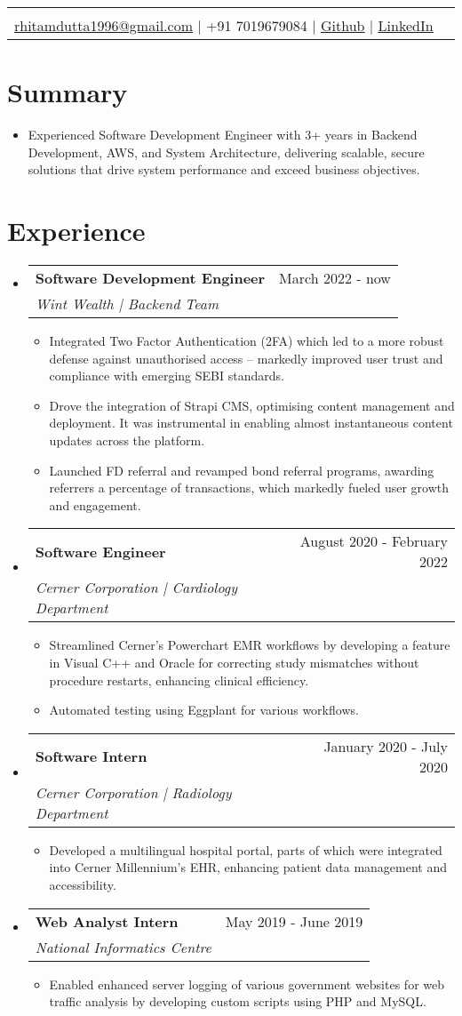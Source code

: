 \documentclass[letterpaper,11pt]{article}
\makeatletter
\newcommand{\sectionStart}{
  \begin{itemize}[label={},leftmargin=0in]
}
\newcommand{\sectionEnd}{
  \end{itemize}
}
\newcommand{\head}[6]{
  \noindent
  \begin{tabular*}{\textwidth}{l@{\extracolsep{\fill}}r}
    \centerline{
      \textbf{\href{#1}{\color{blue}{\LARGE {\underline{#2}}}}}
    }
    \vspace{5pt}\\
    \centerline{
      \href{mailto:#3}{\underline{#3}} $\mid$
      #4 $\mid$
       \href{#5}{\underline{Github}} $\mid$
       \href{#6}{\underline{LinkedIn}}
    }
  \end{tabular*}
  \vspace{-10pt}
}
\newcommand{\summaryText}[1]{
  \item
  \begin{addmargin}[7pt]{0pt}
    \small{#1}
  \end{addmargin}
}
\newcommand{\jobHeading}[3]{
  \vspace{-1pt}
  \item
  \begin{tabular*}{1.0\textwidth}{l@{\extracolsep{\fill}}r@{}}
    \normalsize{\textbf{#1}} & #2 \\
    \textit{\small#3} \\
  \end{tabular*}\vspace{-5pt}
}
\newcommand{\listStart}{\begin{itemize}}
\newcommand{\listEnd}{\end{itemize}\vspace{-6pt}}
\newcommand{\bulletItem}[1]{
  \item
  \small{
    {#1 \vspace{-1.8pt}}
  }
}
\makeatother
\begin{document}
\head
  {https://rhit.am/portfolio/} %
  {Rhitam Dutta} %
  {rhitamdutta1996@gmail.com} %
  {+91 7019679084} %
  {https://github.com/exthazor} %
  {https://www.linkedin.com/in/rhitam-dutta} %

\section{Summary}
\sectionStart
  \summaryText
  {Experienced Software Development Engineer with 3+ years in Backend Development, AWS, and System Architecture, delivering scalable, secure solutions that drive system performance and exceed business objectives.}
\sectionEnd

\section{Experience}
\sectionStart
 \jobHeading
    {Software Development Engineer}
    {March 2022 - now}
    {Wint Wealth | Backend Team}
  \listStart
    \bulletItem
    {Integrated Two Factor Authentication (2FA) which led to a more robust defense against unauthorised access -- markedly improved user trust and compliance with emerging SEBI standards.}
    \bulletItem
    {Drove the integration of Strapi CMS, optimising content management and deployment. It was instrumental in enabling almost instantaneous content updates across the platform.}
   \bulletItem
    {Launched FD referral and revamped bond referral programs, awarding referrers a percentage of transactions, which markedly fueled user growth and engagement.}
   \listEnd
  \jobHeading
    {Software Engineer}
    {August 2020 - February 2022}
    {Cerner Corporation | Cardiology Department}
  \listStart
    \bulletItem
    {Streamlined Cerner's Powerchart EMR workflows by developing a feature in Visual C++ and Oracle for correcting study mismatches without procedure restarts, enhancing clinical efficiency. }
   \bulletItem
   {Automated testing using Eggplant for various workflows.}
   \listEnd
  \jobHeading
    {Software Intern} 
    {January 2020 - July 2020}
    {Cerner Corporation | Radiology Department}
  \listStart
    \bulletItem
    {Developed a multilingual hospital portal, parts of which were integrated into Cerner Millennium's EHR, enhancing patient data management and accessibility.}
  \listEnd
  \jobHeading
    {Web Analyst Intern} 
    {May 2019 - June 2019}
    {National Informatics Centre}
  \listStart
    \bulletItem
    {Enabled enhanced server logging of various government websites for web traffic analysis by developing custom scripts using PHP and MySQL.}
  \listEnd
\sectionEnd
\end{document}
